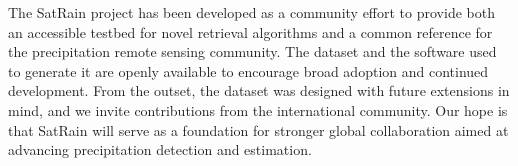 \documentclass[11pt]{article}
\begin{document}
The SatRain project has been developed as a community effort to provide both an
accessible testbed for novel retrieval algorithms and a common reference for the
precipitation remote sensing community. The dataset and the software used to
generate it are openly available to encourage broad adoption and continued
development. From the outset, the dataset was designed with future extensions in
mind, and we invite contributions from the international community. Our hope is
that SatRain will serve as a foundation for stronger global collaboration aimed
at advancing precipitation detection and estimation.





\end{document}
